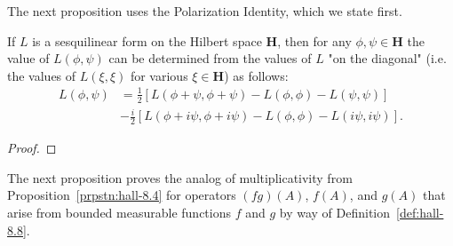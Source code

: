 The next proposition uses the Polarization Identity, which we state first.

\begin{proposition}
    \label{prpstn:hall-a.59}
    \leanok
    If $L$ is a sesquilinear form on the Hilbert space $\mathbf{H}$, then for any $\phi, \psi \in \mathbf{H}$ the value of $L(\phi, \psi)$ can be determined from the values of $L$ "on the diagonal" (i.e. the values of $L(\xi, \xi)$ for various $\xi \in \mathbf{H}$) as follows:
    \begin{align}
        L(\phi, \psi) &= \frac{1}{2} \left[ L(\phi + \psi, \phi + \psi) - L(\phi, \phi) - L(\psi, \psi) \right] \\
                      &-\frac{i}{2} \left[ L(\phi + i\psi, \phi + i\psi) - L(\phi, \phi) - L(i\psi, i\psi) \right]. 
    \end{align}
\end{proposition}
\begin{proof}
\leanok
\end{proof}

The next proposition proves the analog of multiplicativity from Proposition~\ref{prpstn:hall-8.4} for operators $(fg)(A)$, $f(A)$, and $g(A)$ that arise from bounded measurable functions $f$ and $g$ by way of Definition~\ref{def:hall-8.8}.

